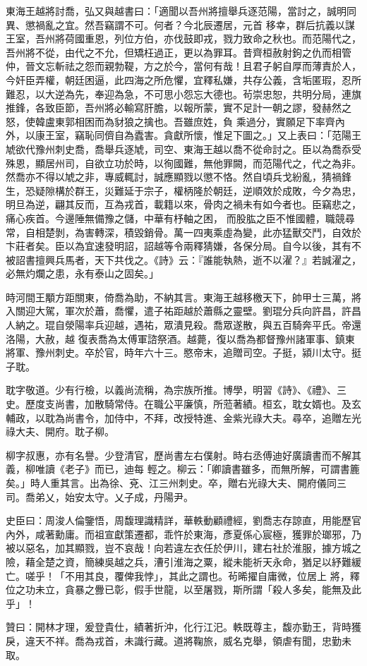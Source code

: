 \begin{pinyinscope}
 東海王越將討喬，弘又與越書曰：「適聞以吾州將擅舉兵逐范陽，當討之，誠明同異、懲禍亂之宜。然吾竊謂不可。何者？今北辰遷居，元首
 移幸，群后抗義以謀王室，吾州將荷國重恩，列位方伯，亦伐鼓即戎，戮力致命之秋也。而范陽代之，吾州將不從，由代之不允，但矯枉過正，更以為罪耳。昔齊桓赦射鉤之仇而相管仲，晉文忘斬祛之怨而親勃鞮，方之於今，當何有哉！且君子躬自厚而薄責於人，今奸臣弄權，朝廷困逼，此四海之所危懼，宜釋私嫌，共存公義，含垢匿瑕，忍所難忍，以大逆為先，奉迎為急，不可思小怨忘大德也。茍崇忠恕，共明分局，連旗推鋒，各致臣節，吾州將必輸寫肝膽，以報所蒙，實不足計一朝之謬，發赫然之怒，使韓盧東郭相困而為豺狼之擒也。吾雖庶姓，負
 乘過分，實願足下率齊內外，以康王室，竊恥同儕自為蠹害。貪獻所懷，惟足下圖之。」又上表曰：「范陽王虓欲代豫州刺史喬，喬舉兵逐虓，司空、東海王越以喬不從命討之。臣以為喬忝受殊恩，顯居州司，自欲立功於時，以徇國難，無他罪闕，而范陽代之，代之為非。然喬亦不得以虓之非，專威輒討，誠應顯戮以懲不恪。然自頃兵戈紛亂，猜禍鋒生，恐疑隙構於群王，災難延于宗子，權柄隆於朝廷，逆順效於成敗，今夕為忠，明旦為逆，翩其反而，互為戎首，載籍以來，骨肉之禍未有如今者也。臣竊悲之，痛心疾首。今邊陲無備豫之儲，中華有杼軸之困，
 而股肱之臣不惟國體，職競尋常，自相楚剝，為害轉深，積毀銷骨。萬一四夷乘虛為變，此亦猛獸交鬥，自效於卞莊者矣。臣以為宜速發明詔，詔越等令兩釋猜嫌，各保分局。自今以後，其有不被詔書擅興兵馬者，天下共伐之。《詩》云：『誰能執熱，逝不以濯？』若誠濯之，必無灼爛之患，永有泰山之固矣。」



 時河間王顒方距關東，倚喬為助，不納其言。東海王越移檄天下，帥甲士三萬，將入關迎大駕，軍次於蕭，喬懼，遣子祐距越於蕭縣之靈壁。劉琨分兵向許昌，許昌人納之。琨自滎陽率兵迎越，遇祐，眾潰見殺。喬眾遂散，與五百騎奔平氏。帝還洛陽，大赦，越
 復表喬為太傅軍諮祭酒。越薨，復以喬為都督豫州諸軍事、鎮東將軍、豫州刺史。卒於官，時年六十三。愍帝末，追贈司空。子挺，潁川太守。挺子耽。



 耽字敬道。少有行檢，以義尚流稱，為宗族所推。博學，明習《詩》、《禮》、三史。歷度支尚書，加散騎常侍。在職公平廉慎，所蒞著績。桓玄，耽女婿也。及玄輔政，以耽為尚書令，加侍中，不拜，改授特進、金紫光祿大夫。尋卒，追贈左光祿大夫、開府。耽子柳。



 柳字叔惠，亦有名譽。少登清官，歷尚書左右僕射。時右丞傅迪好廣讀書而不解其義，柳唯讀《老子》而已，迪每
 輕之。柳云：「卿讀書雖多，而無所解，可謂書簏矣。」時人重其言。出為徐、兗、江三州刺史。卒，贈右光祿大夫、開府儀同三司。喬弟乂，始安太守。乂子成，丹陽尹。



 史臣曰：周浚人倫鑒悟，周馥理識精詳，華軼動顧禮經，劉喬志存諒直，用能歷官內外，咸著勳庸。而祖宣獻策遷都，乖忤於東海，彥夏係心宸極，獲罪於瑯邪，乃被以惡名，加其顯戮，豈不哀哉！向若違左衣任於伊川，建右社於淮服，據方城之險，藉全楚之資，簡練吳越之兵，漕引淮海之粟，縱未能祈天永命，猶足以紓難緩亡。嗟乎！「不用其良，覆俾我悖」，其此之謂也。茍晞擢自庸微，位居上
 將，釋位之功未立，貪暴之釁已彰，假手世龍，以至屠戮，斯所謂「殺人多矣，能無及此乎」！



 贊曰：開林才理，爰登貴仕，績著折沖，化行江汜。軼既尊主，馥亦勤王，背時獲戾，違天不祥。喬為戎首，未識行藏。道將鞠旅，威名克舉，領虐有聞，忠勤未取。



\end{pinyinscope}